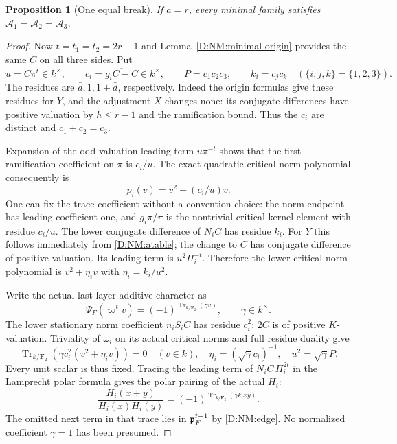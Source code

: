 \documentclass[11pt]{amsart}
\newtheorem{proposition}[theorem]{Proposition}
\theoremstyle{definition}
\theoremstyle{remark}
\newcommand{\F}{\mathbf F}
\newcommand{\Tr}{\operatorname{Tr}}
\begin{document}
\begin{proposition}[One equal break]\label{D:NM:minimal-one}
If $a=r$, every minimal family satisfies
$\mathcal A_1=\mathcal A_2=\mathcal A_3$.
\end{proposition}
\begin{proof}
Now $t=t_1=t_2=2r-1$ and Lemma~\ref{D:NM:minimal-origin} provides the same
$C$ on all three sides. Put
\[
 u=\overline{C\pi^t}\in k^\times,\qquad
 c_i=\overline{g_iC-C}\in k^\times,\qquad P=c_1c_2c_3,
 \qquad k_i=c_jc_k\quad(\{i,j,k\}=\{1,2,3\}).
\]
The residues are $\bar d,1,1+\bar d$, respectively. Indeed the origin
formulas give these residues for $Y$, and the adjustment $X$ changes
none: its conjugate differences have positive valuation by
$h\le r-1$ and the ramification bound. Thus the $c_i$ are distinct and
$c_1+c_2=c_3$.

Expansion of the odd-valuation leading term $u\pi^{-t}$ shows that the
first ramification coefficient on $\pi$ is $c_i/u$.
The exact quadratic critical norm polynomial consequently is
\begin{equation}\label{D:NM:critical-polynomials}
 p_i(v)=v^2+(c_i/u)v.
\end{equation}
One can fix the trace coefficient without a convention choice: the norm
endpoint has leading coefficient one, and $g_i\pi/\pi$ is the nontrivial
critical kernel element with residue $c_i/u$.
The lower conjugate difference of $N_iC$ has residue $k_i$.
For $Y$ this follows immediately from \eqref{D:NM:atable}; the change to
$C$ has conjugate difference of positive valuation. Its leading term is
$u^2\Pi_i^{-t}$. Therefore the lower critical norm polynomial is
$v^2+\eta_i v$ with $\eta_i=k_i/u^2$.

Write the actual last-layer additive character as
\[
 \Psi_F(\varpi^t v)=(-1)^{\Tr_{k/\F_2}(\gamma\bar v)},\qquad
 \gamma\in k^\times.
\]
The lower stationary norm coefficient $n_iS_iC$ has residue $c_i^2$:
$2C$ is of positive $K$-valuation. Triviality of $\omega_i$ on its
actual critical norms and full residue duality give
\[
 \Tr_{k/\F_2}(\gamma c_i^2(v^2+\eta_i v))=0\quad(v\in k),
 \quad \eta_i=(\sqrt\gamma c_i)^{-1},\quad u^2=\sqrt\gamma P.
\]
Every unit scalar is thus fixed. Tracing the leading term of
$N_iC\,\Pi_i^{2t}$ in the Lamprecht polar formula gives the polar
pairing of the actual $H_i$:
\begin{equation}\label{D:NM:polar}
 \frac{H_i(x+y)}{H_i(x)H_i(y)}
       =(-1)^{\Tr_{k/\F_2}(\gamma k_i xy)}.
\end{equation}
The omitted next term in that trace lies in $\mathfrak p_F^{t+1}$ by
\eqref{D:NM:edge}. No normalized coefficient $\gamma=1$ has been presumed.


\end{proof}
\end{document}
